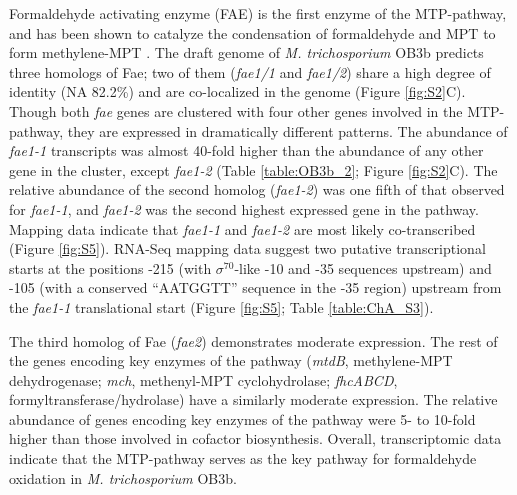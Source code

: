 Formaldehyde activating enzyme (FAE) is the first enzyme of the MTP-pathway, and has been shown to catalyze the condensation of formaldehyde and MPT to form methylene-MPT \cite{vorholt2000}.
The draft genome of \textit{M. trichosporium} OB3b predicts three homologs of Fae; two of them (\textit{fae1/1} and \textit{fae1/2}) share a high degree of identity (NA 82.2\%) and are co-localized in the genome (Figure \ref{fig:S2}C).
Though both \textit{fae} genes are clustered with four other genes involved in the MTP-pathway, they are expressed in dramatically different patterns.
The abundance of \textit{fae1-1} transcripts was almost 40-fold higher than the abundance of any other gene in the cluster, except \textit{fae1-2} (Table \ref{table:OB3b_2}; Figure \ref{fig:S2}C).
The relative abundance of the second homolog (\textit{fae1-2}) was one fifth of that observed for \textit{fae1-1}, and \textit{fae1-2} was the second highest expressed gene in the pathway.
Mapping data indicate that \textit{fae1-1} and \textit{fae1-2} are most likely co-transcribed (Figure \ref{fig:S5}).
RNA-Seq mapping data suggest two putative transcriptional starts at the positions -215 (with $\sigma^{70}$-like -10 and -35 sequences upstream) and -105 (with a conserved ``AATGGTT'' sequence in the -35 region) upstream from the \textit{fae1-1} translational start (Figure \ref{fig:S5}; Table \ref{table:ChA_S3}).

The third homolog of Fae (\textit{fae2}) demonstrates moderate expression.
The rest of the genes encoding key enzymes of the pathway (\textit{mtdB}, methylene-MPT dehydrogenase; \textit{mch}, methenyl-MPT cyclohydrolase; \textit{fhcABCD}, formyltransferase/hydrolase) have a similarly moderate expression.
The relative abundance of genes encoding key enzymes of the pathway were 5- to 10-fold higher than those involved in cofactor biosynthesis.
Overall, transcriptomic data indicate that the MTP-pathway serves as the key pathway for formaldehyde oxidation in \textit{M. trichosporium} OB3b.

